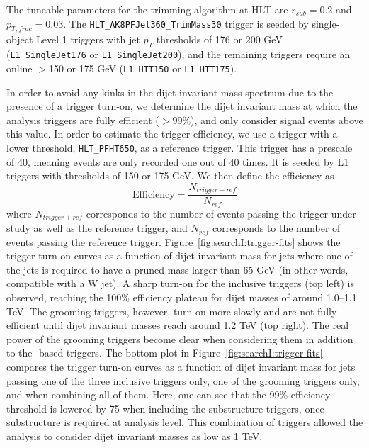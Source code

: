 The tuneable parameters for the trimming algorithm at HLT are $r_{sub}=0.2$ and $p_{T,frac}=0.03$. The \texttt{HLT\_AK8PFJet360\_TrimMass30} trigger is seeded by single-object Level 1 triggers with jet $p_T$ thresholds of 176 or 200 GeV (\texttt{L1\_SingleJet176} or \texttt{L1\_SingleJet200}), and the remaining triggers require an online \HT{}$>$150 or 175 GeV (\texttt{L1\_HTT150} or \texttt{L1\_HTT175}).\par
In order to avoid any kinks in the dijet invariant mass spectrum due to the presence of a trigger turn-on, we determine the dijet invariant mass at which the analysis triggers are fully efficient ($>99\%$), and only consider signal events above this value. In order to estimate the trigger efficiency, we use a trigger with a lower \HT threshold, \texttt{HLT\_PFHT650}, as a reference trigger. This trigger has a prescale of 40, meaning events are only recorded one out of 40 times. It is seeded by L1 \HT triggers with thresholds of 150 or 175 GeV. We then define the efficiency as
\begin{equation*}
\textrm{Efficiency} = \frac{N_{trigger+ref}}{N_{ref}}  
\end{equation*}
where $N_{trigger+ref}$ corresponds to the number of events passing the trigger under study as well as the reference trigger, and $N_{ref}$ corresponds to the number of events passing the reference trigger. Figure~\ref{fig:searchI:trigger-fits} shows the trigger turn-on curves as a function of dijet invariant mass for jets where one of the jets is required to have a pruned mass larger than 65 GeV (in other words, compatible with a W jet). A sharp turn-on for the inclusive triggers (top left) is observed, reaching the 100\% efficiency plateau for dijet masses of around 1.0--1.1 TeV. The grooming triggers, however, turn on more slowly and are not fully efficient until dijet invariant masses reach around 1.2 TeV (top right). The real power of the grooming triggers become clear when considering them in addition to the \HT-based triggers. The bottom plot in Figure~\ref{fig:searchI:trigger-fits} compares the trigger turn-on curves as a function of dijet invariant mass for jets passing one of the three inclusive triggers only, one of the grooming triggers only, and when combining all of them. Here, one can see that the 99\% efficiency threshold is lowered by 75 \GeV when including the substructure triggers, once substructure is required at analysis level. This combination of triggers allowed the analysis to consider dijet invariant masses as low as 1 TeV.
